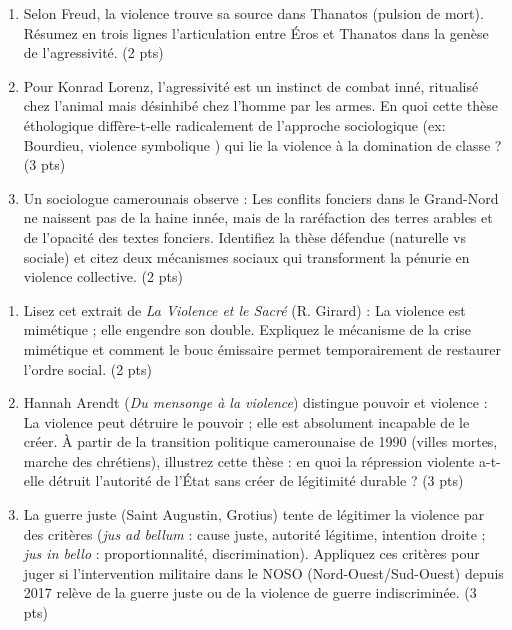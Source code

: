 \documentclass[11pt]{article}
\begin{document}
\begin{exercice}
\begin{enumerate}
    \item Selon Freud, la violence trouve sa source dans \og Thanatos \fg{} (pulsion de mort). Résumez en trois lignes l'articulation entre \og Éros \fg{} et \og Thanatos \fg{} dans la genèse de l'agressivité. (2 pts)
    \item Pour Konrad Lorenz, l'agressivité est un \og instinct de combat \fg{} inné, ritualisé chez l'animal mais désinhibé chez l'homme par les armes. En quoi cette thèse éthologique diffère-t-elle radicalement de l'approche sociologique (ex: Bourdieu, \og violence symbolique \fg{}) qui lie la violence à la domination de classe ? (3 pts)
    \item Un sociologue camerounais observe : \og Les conflits fonciers dans le Grand-Nord ne naissent pas de la haine innée, mais de la raréfaction des terres arables et de l'opacité des textes fonciers. \fg{} Identifiez la thèse défendue (naturelle vs sociale) et citez deux mécanismes sociaux qui transforment la pénurie en violence collective. (2 pts)
\end{enumerate}
\end{exercice}

\begin{exercice}
\begin{enumerate}
    \item Lisez cet extrait de \textit{La Violence et le Sacré} (R. Girard) : \og La violence est mimétique ; elle engendre son double. \fg{} Expliquez le mécanisme de la \og crise mimétique \fg{} et comment le \og bouc émissaire \fg{} permet temporairement de restaurer l'ordre social. (2 pts)
    \item Hannah Arendt (\textit{Du mensonge à la violence}) distingue \og pouvoir \fg{} et \og violence \fg{} : \og La violence peut détruire le pouvoir ; elle est absolument incapable de le créer. \fg{} À partir de la transition politique camerounaise de 1990 (villes mortes, marche des chrétiens), illustrez cette thèse : en quoi la répression violente a-t-elle détruit l'autorité de l'État sans créer de légitimité durable ? (3 pts)
    \item La \og guerre juste \fg{} (Saint Augustin, Grotius) tente de légitimer la violence par des critères (\textit{jus ad bellum} : cause juste, autorité légitime, intention droite ; \textit{jus in bello} : proportionnalité, discrimination). Appliquez ces critères pour juger si l'intervention militaire dans le NOSO (Nord-Ouest/Sud-Ouest) depuis 2017 relève de la \og guerre juste \fg{} ou de la \og violence de guerre \fg{} indiscriminée. (3 pts)
\end{enumerate}
\end{exercice}
\end{document}
